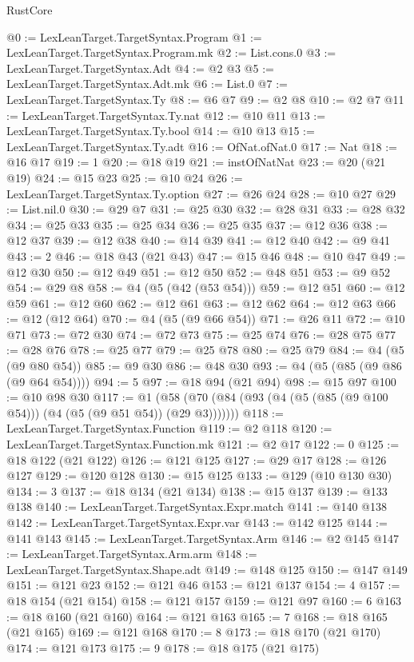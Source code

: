\begin{lexlean}{RustCore}
\begin{coremodule}
@0 := LexLeanTarget.TargetSyntax.Program
@1 := LexLeanTarget.TargetSyntax.Program.mk
@2 := List.cons.{0}
@3 := LexLeanTarget.TargetSyntax.Adt
@4 := @2 @3
@5 := LexLeanTarget.TargetSyntax.Adt.mk
@6 := List.{0}
@7 := LexLeanTarget.TargetSyntax.Ty
@8 := @6 @7
@9 := @2 @8
@10 := @2 @7
@11 := LexLeanTarget.TargetSyntax.Ty.nat
@12 := @10 @11
@13 := LexLeanTarget.TargetSyntax.Ty.bool
@14 := @10 @13
@15 := LexLeanTarget.TargetSyntax.Ty.adt
@16 := OfNat.ofNat.{0}
@17 := Nat
@18 := @16 @17
@19 := 1
@20 := @18 @19
@21 := instOfNatNat
@23 := @20 (@21 @19)
@24 := @15 @23
@25 := @10 @24
@26 := LexLeanTarget.TargetSyntax.Ty.option
@27 := @26 @24
@28 := @10 @27
@29 := List.nil.{0}
@30 := @29 @7
@31 := @25 @30
@32 := @28 @31
@33 := @28 @32
@34 := @25 @33
@35 := @25 @34
@36 := @25 @35
@37 := @12 @36
@38 := @12 @37
@39 := @12 @38
@40 := @14 @39
@41 := @12 @40
@42 := @9 @41
@43 := 2
@46 := @18 @43 (@21 @43)
@47 := @15 @46
@48 := @10 @47
@49 := @12 @30
@50 := @12 @49
@51 := @12 @50
@52 := @48 @51
@53 := @9 @52
@54 := @29 @8
@58 := @4 (@5 (@42 (@53 @54)))
@59 := @12 @51
@60 := @12 @59
@61 := @12 @60
@62 := @12 @61
@63 := @12 @62
@64 := @12 @63
@66 := @12 (@12 @64)
@70 := @4 (@5 (@9 @66 @54))
@71 := @26 @11
@72 := @10 @71
@73 := @72 @30
@74 := @72 @73
@75 := @25 @74
@76 := @28 @75
@77 := @28 @76
@78 := @25 @77
@79 := @25 @78
@80 := @25 @79
@84 := @4 (@5 (@9 @80 @54))
@85 := @9 @30
@86 := @48 @30
@93 := @4 (@5 (@85 (@9 @86 (@9 @64 @54))))
@94 := 5
@97 := @18 @94 (@21 @94)
@98 := @15 @97
@100 := @10 @98 @30
@117 := @1 (@58 (@70 (@84 (@93 (@4 (@5 (@85 (@9 @100 @54))) (@4 (@5 (@9 @51 @54)) (@29 @3)))))))
@118 := LexLeanTarget.TargetSyntax.Function
@119 := @2 @118
@120 := LexLeanTarget.TargetSyntax.Function.mk
@121 := @2 @17
@122 := 0
@125 := @18 @122 (@21 @122)
@126 := @121 @125
@127 := @29 @17
@128 := @126 @127
@129 := @120 @128
@130 := @15 @125
@133 := @129 (@10 @130 @30)
@134 := 3
@137 := @18 @134 (@21 @134)
@138 := @15 @137
@139 := @133 @138
@140 := LexLeanTarget.TargetSyntax.Expr.match
@141 := @140 @138
@142 := LexLeanTarget.TargetSyntax.Expr.var
@143 := @142 @125
@144 := @141 @143
@145 := LexLeanTarget.TargetSyntax.Arm
@146 := @2 @145
@147 := LexLeanTarget.TargetSyntax.Arm.arm
@148 := LexLeanTarget.TargetSyntax.Shape.adt
@149 := @148 @125
@150 := @147 @149
@151 := @121 @23
@152 := @121 @46
@153 := @121 @137
@154 := 4
@157 := @18 @154 (@21 @154)
@158 := @121 @157
@159 := @121 @97
@160 := 6
@163 := @18 @160 (@21 @160)
@164 := @121 @163
@165 := 7
@168 := @18 @165 (@21 @165)
@169 := @121 @168
@170 := 8
@173 := @18 @170 (@21 @170)
@174 := @121 @173
@175 := 9
@178 := @18 @175 (@21 @175)

\end{coremodule}
\end{lexlean}
